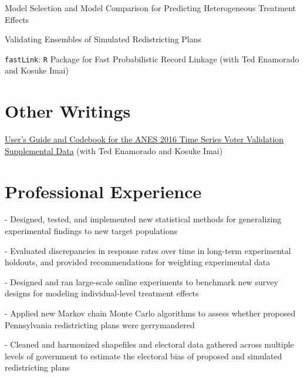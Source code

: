 \documentclass[]{deedy-resume-openfont}
\begin{document}
Model Selection and Model Comparison for Predicting Heterogeneous Treatment Effects\\\vspace{2mm}

Validating Ensembles of Simulated Redistricting Plans\\\vspace{2mm}

\texttt{fastLink}: \texttt{R} Package for Fast Probabilistic Record Linkage (with Ted Enamorado and Kosuke Imai)\\\vspace{2mm}
\sectionsep

\section{Other Writings}
\href{https://www.electionstudies.org/wp-content/uploads/2018/03/anes_timeseries_2016voteval_userguidecodebook.pdf}{User’s Guide and Codebook for the ANES 2016 Time Series Voter Validation Supplemental Data} (with Ted Enamorado and Kosuke Imai)
\sectionsep


\section{Professional Experience}
\begin{tightemize}
\item[-] Designed, tested, and implemented new statistical methods for generalizing experimental findings to new target populations
\item[-] Evaluated discrepancies in response rates over time in long-term experimental holdouts, and provided recommendations for weighting experimental data 
\item[-] Designed and ran large-scale online experiments to benchmark new survey designs for modeling individual-level treatment effects
\end{tightemize}
\sectionsep

\begin{tightemize}
\item[-] Applied new Markov chain Monte Carlo algorithms to assess whether proposed Pennsylvania redistricting plans were gerrymandered
\item[-] Cleaned and harmonized shapefiles and electoral data gathered across multiple levels of government to estimate the electoral bias of proposed and simulated redistricting plans
\end{tightemize}
\sectionsep
\end{document}
